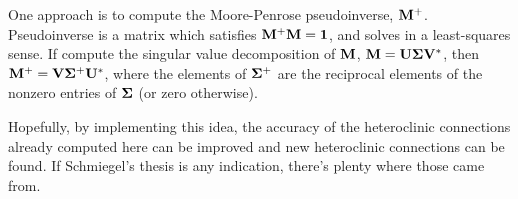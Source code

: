 One approach is to compute the Moore-Penrose pseudoinverse,
$\bf M^+$.  Pseudoinverse is a matrix which satisfies $\bf M^+ M = {\bf 1}$,
and solves  in a least-squares sense.
If compute the singular value decomposition of ${\bf M}$, $\bf M = U \Sigma V^*$, then $\bf M^+ = V \Sigma^+ U^*$,
where the elements of $\bf \Sigma^+$ are the reciprocal elements of the nonzero entries of $\bf \Sigma$
(or zero otherwise).

Hopefully, by implementing this idea, the accuracy of the heteroclinic connections already computed
here can be improved and new heteroclinic connections can be found.  If Schmiegel's thesis \cite{Schmi99} is
any indication, there's plenty where those came from.
%
%
